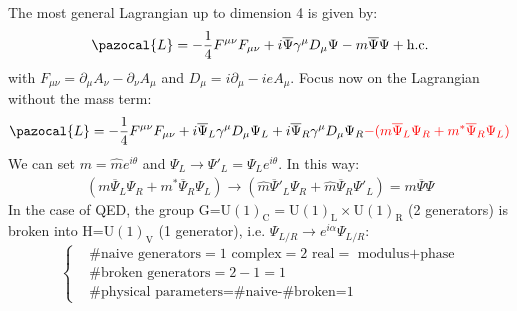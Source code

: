 \documentclass[../main.tex]{subfiles}
\begin{document}
The most general Lagrangian up to dimension 4 is given by:
\[
\pazocal{L}=-\frac{1}{4}F^{\mu\nu}F_{\mu\nu}+i\overline{\Psi}\gamma^\mu D_\mu\Psi-m\overline{\Psi}\Psi+\text{h.c.}
\]
with $F_{\mu\nu}=\partial_\mu A_\nu-\partial_\nu A_\mu$ and $D_\mu=i\partial_\mu-ieA_\mu$. Focus now on the Lagrangian without the mass term:
\[
\pazocal{L}=-\frac{1}{4}F^{\mu\nu}F_{\mu\nu}+i\overline{\Psi}_L\gamma^\mu D_\mu\Psi_L+i\overline{\Psi}_R\gamma^\mu D_\mu\Psi_R{\color{red}
-(m\overline{\Psi}_L\Psi_R+m^*\overline{\Psi}_R\Psi_L)}
\]
We can set $m=\hat{m}e^{i\theta}$ and $\Psi_L\xrightarrow[]{}\Psi'_L=\Psi_Le^{i\theta}$. In this way:
\[
(m\overline{\Psi}_L\Psi_R+m^*\overline{\Psi}_R\Psi_L)\xrightarrow[]{}(\hat{m}\overline{\Psi}'_L\Psi_R+\hat{m}\overline{\Psi}_R\Psi'_L)=m\overline{\Psi}\Psi
\]
In the case of QED, the group G=U$(1)_{\text{C}}=$U$(1)_{\text{L}}\times$U$(1)_{\text{R}}$ (2 generators) is broken into H=U$(1)_{\text{V}}$ (1 generator), i.e. $\Psi_{L/R}\xrightarrow[]{}e^{i\alpha}\Psi_{L/R}$:
\[
\left\{
\begin{aligned}
&\text{\# naive generators}=1 \text{ complex}=2 \text{ real}=\text{ modulus+phase}\\
&\text{\# broken generators}=2-1=1\\
&\text{\# physical parameters=\# naive-\# broken=1}
\end{aligned}
\right.
\]
\end{document}

